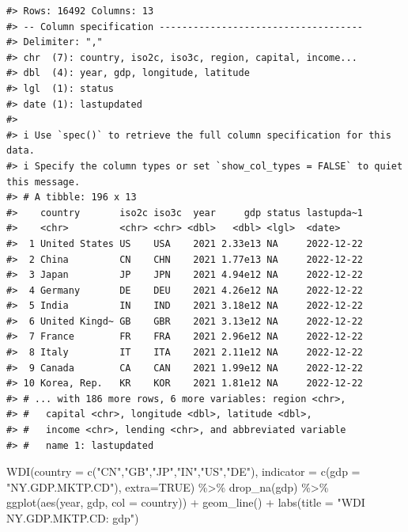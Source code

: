 \documentclass[
]{bxjsbook}
\newenvironment{Shaded}{\begin{snugshade}}{\end{snugshade}}
\newcommand{\AttributeTok}[1]{\textcolor[rgb]{0.77,0.63,0.00}{#1}}
\newcommand{\ConstantTok}[1]{\textcolor[rgb]{0.00,0.00,0.00}{#1}}
\newcommand{\FunctionTok}[1]{\textcolor[rgb]{0.00,0.00,0.00}{#1}}
\newcommand{\NormalTok}[1]{#1}
\newcommand{\SpecialCharTok}[1]{\textcolor[rgb]{0.00,0.00,0.00}{#1}}
\newcommand{\StringTok}[1]{\textcolor[rgb]{0.31,0.60,0.02}{#1}}
\theoremstyle{definition}
\theoremstyle{definition}
\theoremstyle{definition}
\theoremstyle{definition}
\theoremstyle{remark}
\begin{document}
\begin{verbatim}
#> Rows: 16492 Columns: 13
#> -- Column specification ------------------------------------
#> Delimiter: ","
#> chr  (7): country, iso2c, iso3c, region, capital, income...
#> dbl  (4): year, gdp, longitude, latitude
#> lgl  (1): status
#> date (1): lastupdated
#> 
#> i Use `spec()` to retrieve the full column specification for this data.
#> i Specify the column types or set `show_col_types = FALSE` to quiet this message.
#> # A tibble: 196 x 13
#>    country       iso2c iso3c  year     gdp status lastupda~1
#>    <chr>         <chr> <chr> <dbl>   <dbl> <lgl>  <date>    
#>  1 United States US    USA    2021 2.33e13 NA     2022-12-22
#>  2 China         CN    CHN    2021 1.77e13 NA     2022-12-22
#>  3 Japan         JP    JPN    2021 4.94e12 NA     2022-12-22
#>  4 Germany       DE    DEU    2021 4.26e12 NA     2022-12-22
#>  5 India         IN    IND    2021 3.18e12 NA     2022-12-22
#>  6 United Kingd~ GB    GBR    2021 3.13e12 NA     2022-12-22
#>  7 France        FR    FRA    2021 2.96e12 NA     2022-12-22
#>  8 Italy         IT    ITA    2021 2.11e12 NA     2022-12-22
#>  9 Canada        CA    CAN    2021 1.99e12 NA     2022-12-22
#> 10 Korea, Rep.   KR    KOR    2021 1.81e12 NA     2022-12-22
#> # ... with 186 more rows, 6 more variables: region <chr>,
#> #   capital <chr>, longitude <dbl>, latitude <dbl>,
#> #   income <chr>, lending <chr>, and abbreviated variable
#> #   name 1: lastupdated
\end{verbatim}

\begin{Shaded}
\begin{Highlighting}[]
\FunctionTok{WDI}\NormalTok{(}\AttributeTok{country =} \FunctionTok{c}\NormalTok{(}\StringTok{"CN"}\NormalTok{,}\StringTok{"GB"}\NormalTok{,}\StringTok{"JP"}\NormalTok{,}\StringTok{"IN"}\NormalTok{,}\StringTok{"US"}\NormalTok{,}\StringTok{"DE"}\NormalTok{), }\AttributeTok{indicator =} \FunctionTok{c}\NormalTok{(}\AttributeTok{gdp =} \StringTok{"NY.GDP.MKTP.CD"}\NormalTok{), }\AttributeTok{extra=}\ConstantTok{TRUE}\NormalTok{) }\SpecialCharTok{\%\textgreater{}\%} \FunctionTok{drop\_na}\NormalTok{(gdp) }\SpecialCharTok{\%\textgreater{}\%} 
  \FunctionTok{ggplot}\NormalTok{(}\FunctionTok{aes}\NormalTok{(year, gdp, }\AttributeTok{col =}\NormalTok{ country)) }\SpecialCharTok{+} \FunctionTok{geom\_line}\NormalTok{() }\SpecialCharTok{+}
  \FunctionTok{labs}\NormalTok{(}\AttributeTok{title =} \StringTok{"WDI NY.GDP.MKTP.CD: gdp"}\NormalTok{)}
\end{Highlighting}
\end{Shaded}
\end{document}
